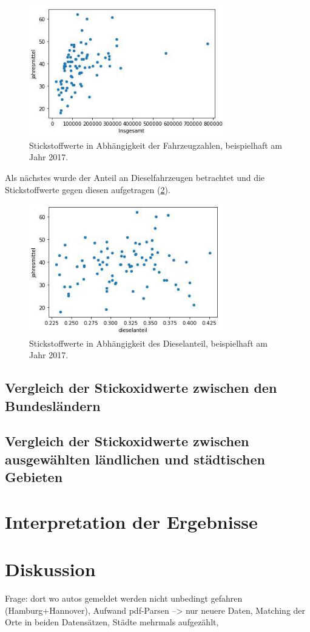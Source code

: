\documentclass[11pt,a4paper,oneside,german]{article}
\begin{document}
\begin{figure}[h!]
	\centering
	\includegraphics[width=8.5cm]{NO2Insgesamt.jpg}
	\caption{Stickstoffwerte in Abhängigkeit der Fahrzeugzahlen, beispielhaft am Jahr 2017.}
	\label{fig:NO2Insgesamt}
\end{figure}

Als nächstes wurde der Anteil an Dieselfahrzeugen betrachtet und die Stickstoffwerte gegen diesen aufgetragen (\ref{fig:dieselanteil}).

\begin{figure}[h!]
	\centering
	\includegraphics[width=8.5cm]{dieselanteil.jpg}
	\caption{Stickstoffwerte in Abhängigkeit des Dieselanteil, beispielhaft am Jahr 2017.}
	\label{fig:dieselanteil}
\end{figure}

\subsection{Vergleich der Stickoxidwerte zwischen den Bundesländern}

\subsection{Vergleich der Stickoxidwerte zwischen ausgewählten ländlichen und städtischen Gebieten}

\section{Interpretation der Ergebnisse}

\section{Diskussion}

Frage: dort wo autos gemeldet werden nicht unbedingt gefahren (Hamburg+Hannover), Aufwand pdf-Parsen --> nur neuere Daten, Matching der Orte in beiden Datensätzen, Städte mehrmals aufgezählt,
\end{document}
